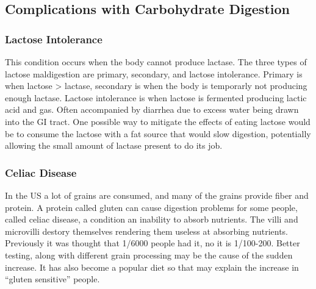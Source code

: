 \documentclass[letterpaper, 11pt]{article}
\begin{document}
\subsection{Complications with Carbohydrate Digestion}
\label{sec:org32b6957}
\subsubsection{Lactose Intolerance}
\label{sec:org371d1e2}
This condition occurs when the body cannot produce lactase. The three types of lactose maldigestion are primary, secondary, and lactose intolerance. Primary is when lactose > lactase, secondary is when the body is temporarly not producing enough lactase. Lactose intolerance is when lactose is fermented producing lactic acid and gas. Often accompanied by diarrhea due to excess water being drawn into the GI tract. One possible way to mitigate the effects of eating lactose would be to consume the lactose with a fat source that would slow digestion, potentially allowing the small amount of lactase present to do its job.\\
\subsubsection{Celiac Disease}
\label{sec:org2bbeb61}
In the US a lot of grains are consumed, and many of the grains provide fiber and protein. A protein called gluten can cause digestion problems for some people, called celiac disease, a condition an inability to absorb nutrients. The villi and microvilli destory themselves rendering them useless at absorbing nutrients. Previously it was thought that 1/6000 people had it, no it is 1/100-200. Better testing, along with different grain processing may be the cause of the sudden increase. It has also become a popular diet so that may explain the increase in ``gluten sensitive'' people.\\
\end{document}
